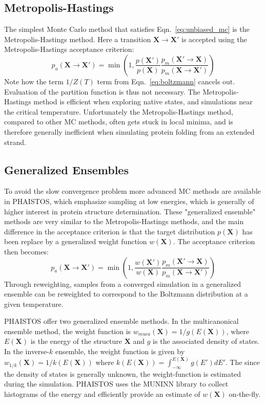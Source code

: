 \subsection{Metropolis-Hastings}
The simplest Monte Carlo method that satisfies Eqn.~\ref{eq:unbiased_mc} is the Metropolis-Hastings method.
Here a transition $\mathbf{X} \rightarrow \mathbf{X'}$ is accepted using the Metropolis-Hastings acceptance criterion:
\begin{equation}
    \label{eq:mc_mh}
    p_a(\mathbf{X} \rightarrow \mathbf{X'}) = \min \left( 1,
    \frac{p(\mathbf{X'})}
         {p(\mathbf{X})}
    \frac{p_m(\mathbf{X'} \rightarrow \mathbf{X})}
         {p_m(\mathbf{X} \rightarrow \mathbf{X'})} \right)
\end{equation}
Note how the term $1/Z(T)$ term from Eqn.~\ref{eq:boltzmann} cancels out.
Evaluation of the partition function is thus not necessary.
The Metropolis-Hastings method is efficient when exploring native states, and simulations near the critical temperature.
Unfortunately the Metropolis-Hastings method, compared to other MC methods, often gets stuck in local minima, and is therefore generally inefficient when simulating protein folding from an extended strand.

\subsection{Generalized Ensembles}
To avoid the slow convergence problem more advanced MC methods are available in PHAISTOS, which emphasize sampling at low energies, which is generally of higher interest in protein structure determination.
These "generalized ensemble" methods are very similar to the Metropolis-Hastings methods, and the main difference in the acceptance criterion is that the target distribution $p(\mathbf{X})$ has been replace by a generalized weight function $w(\mathbf{X})$. 
The acceptance criterion then becomes:
\begin{equation}
    \label{eq:mc_gh}
    p_a(\mathbf{X} \rightarrow \mathbf{X'}) = \min \left( 1,
    \frac{w(\mathbf{X'})}
         {w(\mathbf{X})}
    \frac{p_m(\mathbf{X'} \rightarrow \mathbf{X})}
         {p_m(\mathbf{X} \rightarrow \mathbf{X'})} \right)
\end{equation}
Through reweighting, samples from a converged simulation in a generalized ensemble can be reweighted to correspond to the Boltzmann distribution at a given temperature.

PHAISTOS offer two generalized ensemble methods.
In the multicanonical ensemble method, the weight function is $w_\textit{muca}(\mathbf{X}) = 1/g(E(\mathbf{X}))$, where $E(\mathbf{X})$ is the energy of the structure $\mathbf{X}$ and $g$ is the associated density of states.
In the inverse-$k$ ensemble, the weight function is given by $w_\textit{1/k}(\mathbf{X}) = 1/k(E(\mathbf{X}))$ where $k(E(\mathbf{X})) = \int_{-\infty}^{E(\mathbf{X})} g(E') dE'$.
The since the density of states is generally unknown, the weight-function is estimated during the simulation.
PHAISTOS uses the MUNINN library to collect histograms of the energy and efficiently provide an estimate of $w(\mathbf{X})$ on-the-fly.


